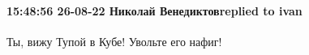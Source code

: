  
 
 
 
 

\paragraph{15:48:56 26-08-22 Николай Венедиктовreplied to ivan}

Ты, вижу Тупой в Кубе! Увольте его нафиг!
